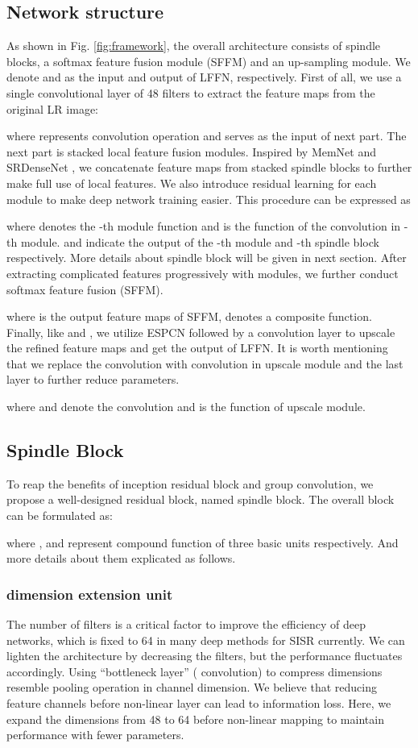 \documentclass[journal]{IEEEtran}
\begin{document}
\subsection{Network structure}
As shown in Fig. \ref{fig:framework}, the overall architecture consists of  spindle blocks, a softmax feature fusion module (SFFM) and an up-sampling module. We denote  and  as the input and output of LFFN, respectively. First of all, we use a single  convolutional layer of 48 filters to extract the feature maps from the original LR image:

where  represents convolution operation and  serves as the input of next part. The next part is  stacked local feature fusion modules. Inspired by MemNet \cite{tai2017memnet} and SRDenseNet \cite{tong2017image}, we concatenate feature maps from  stacked spindle blocks to further make full use of local features. We also introduce residual learning for each module to make deep network training easier. This procedure can be expressed as

where  denotes the -th module function and  is the function of the  convolution in -th module.  and  indicate the output of the -th module and -th spindle block respectively. More details about spindle block will be given in next section. After extracting complicated features progressively with  modules, we further conduct softmax feature fusion (SFFM).

where  is the output feature maps of SFFM,  denotes a composite function. Finally, like\cite{ledig2017photo} and \cite{lim2017enhanced} , we utilize ESPCN \cite{shi2016real} followed by a convolution layer to upscale the refined feature maps and get the output of LFFN. It is worth mentioning that we replace the  convolution with  convolution in upscale module and the last layer to further reduce parameters.

where  and  denote the  convolution and  is the function of upscale module.
\subsection{Spindle Block}
To reap the benefits of inception residual block \cite{szegedy2017inception} and group convolution, we propose a well-designed residual block, named spindle block. The overall block can be formulated as:

where ,  and  represent compound function of three basic units respectively. And more details about them explicated as follows.
\subsubsection{dimension extension unit}
The number of filters is a critical factor to improve the efficiency of deep networks, which is fixed to 64 in many deep methods for SISR currently. We can lighten the architecture by decreasing the filters, but the performance fluctuates accordingly. Using ``bottleneck layer'' \cite{szegedy2015going} ( convolution) to compress dimensions resemble pooling operation in channel dimension. We believe that reducing feature channels before non-linear layer can lead to information loss. Here, we expand the dimensions from 48 to 64 before non-linear mapping to maintain performance with fewer parameters. 
\end{document}
